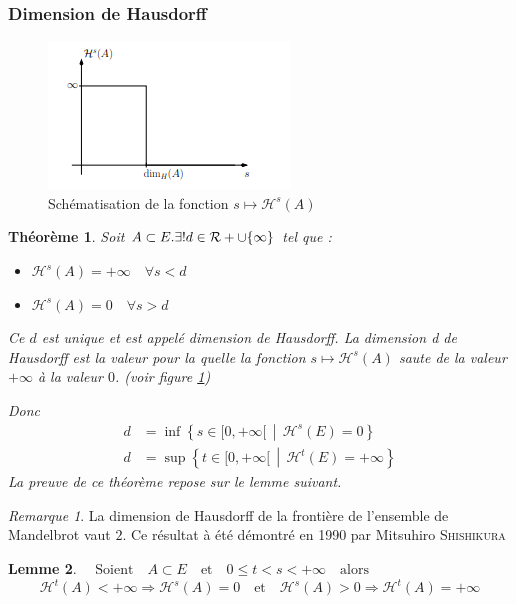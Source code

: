 \documentclass[12pt,a4paper]{article}
\theoremstyle{plain}
\theoremstyle{plain}
\newtheorem{theo}{Théorème}[section]
\newtheorem{lemme}[theo]{Lemme}
\theoremstyle{definition}
\theoremstyle{remark}
\newtheorem*{rmq}{Remarque}
\newcommand{\enstq}[2]{\left\{#1\,\middle|\,#2\right\}}
\newcommand{\R}[1]{\mathcal{R}}
\newcommand{\textm}[1]{\quad \text{#1} \quad}
\begin{document}
\subsubsection{Dimension de Hausdorff}
\begin{figure}[h]
\centering
	\caption{Schématisation de la fonction $s \longmapsto \mathcal{H}^s(A)$}
	\label{schéma dimension hausdorff}
	\includegraphics{dimension hausdorff.png}
\end{figure}
\begin{theo}\label{Hausdorff}
Soit $A \subset E. \exists !d \in \R_+\cup \{\infty\}$ tel que :
\begin{itemize}
\item $\mathcal{H}^s(A) = + \infty \quad \forall s<d$
\item $\mathcal{H}^s(A)=0 \quad \forall s>d$
\end{itemize}
Ce $d$ est unique et est appelé dimension de Hausdorff. La dimension d de Hausdorff est la valeur pour la quelle la fonction $s \mapsto \mathcal{H}^s(A)$ saute de la valeur $+ \infty$ à la valeur $0$. (voir figure \ref{schéma dimension hausdorff})

Donc
\begin{equation*}\label{x}
\begin{split}
d &= \inf \enstq{s \in [0, +\infty[}{\mathcal{H}^s(E)=0}\\
d &= \sup \enstq{t \in [0, +\infty[}{\mathcal{H}^t(E)=+\infty}
\end{split}
\end{equation*} 
La preuve de ce théorème repose sur le lemme suivant.
\end{theo}
\begin{rmq}
La dimension de Hausdorff de la frontière de l'ensemble de Mandelbrot vaut $2$. Ce résultat à été démontré en 1990 par Mitsuhiro \textsc{Shishikura}
\end {rmq}
\begin{lemme}\label{lemme}
$\textm{Soient} A \subset E \textm{et} 0\leq t <s<+\infty \textm{alors}$
\[\mathcal{H}^t(A) <+ \infty \Rightarrow \mathcal{H}^s (A)=0 \textm{et} \mathcal{H}^s(A)>0 \Rightarrow \mathcal{H}^t(A) = + \infty\]
\end{lemme}
\end{document}
